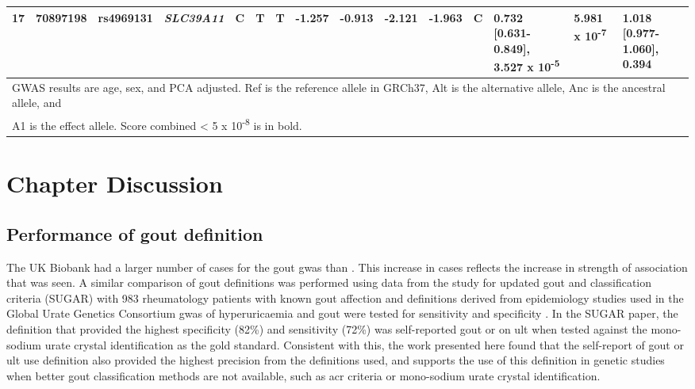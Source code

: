 \documentclass[]{report}
\begin{document}
\begin{landscape}
\begin{table}
{\begin{tabular}[t]{rrlllllllllllll}
\hspace{1em}17 & 70897198 & rs4969131 & \em{SLC39A11} & C & T & T & -1.257 & -0.913 & -2.121 & -1.963 & C & 0.732 [0.631-0.849], 3.527 x 10\textsuperscript{-5} & 5.981 x 10\textsuperscript{-7} & 1.018 [0.977-1.060], 0.394\\
\bottomrule
\multicolumn{15}{l}{GWAS results are age, sex, and PCA adjusted. Ref is the reference allele in GRCh37, Alt is the alternative allele, Anc is the ancestral allele, and}\\
\multicolumn{15}{l}{A1 is the effect allele. Score combined < 5 x 10\textsuperscript{-8} is in bold.}\\
\end{tabular}}
\end{table}
\end{landscape}

\section{Chapter Discussion}\label{chapter-discussion-1}

\subsection{Performance of gout
definition}\label{performance-of-gout-definition}

The UK Biobank had a larger number of cases for the gout \gls{gwas} than
\citet{Kottgen2013}. This increase in cases reflects the increase in
strength of association that was seen. A similar comparison of gout
definitions was performed using data from the study for updated gout and
classification criteria (SUGAR) with 983 rheumatology patients with
known gout affection and definitions derived from epidemiology studies
used in the Global Urate Genetics Consortium \gls{gwas} of
hyperuricaemia and gout were tested for sensitivity and specificity
\citep{Dalbeth2016}. In the SUGAR paper, the definition that provided
the highest specificity (82\%) and sensitivity (72\%) was self-reported
gout or on \gls{ult} when tested against the mono-sodium urate crystal
identification as the gold standard. Consistent with this, the work
presented here found that the self-report of gout or \gls{ult} use
definition also provided the highest precision from the definitions
used, and supports the use of this definition in genetic studies when
better gout classification methods are not available, such as \gls{acr}
criteria or mono-sodium urate crystal identification.
\end{document}
